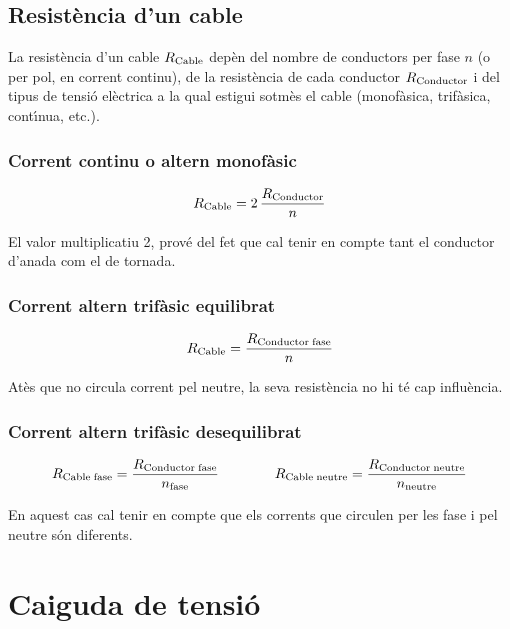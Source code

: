 \subsection{Resist\`{e}ncia d'un cable}

La resist\`{e}ncia d'un cable $R_\mathrm{Cable}$ dep\`{e}n del nombre de conductors per fase $n$ (o
per pol, en corrent continu), de la resist\`{e}ncia de cada conductor $R_\mathrm{Conductor}$ i del
tipus de tensi\'{o} el\`{e}ctrica a la qual estigui sotm\`{e}s el cable (monof\`{a}sica, trif\`{a}sica,
cont\'{\i}nua, etc.).

\subsubsection*{Corrent continu o altern monof\`{a}sic}
\begin{equation}\label{eq:r_cc_mono}
    R_\mathrm{Cable} = 2\, \frac{R_\mathrm{Conductor}}{n}
\end{equation}

El valor multiplicatiu 2, prov\'{e} del fet que cal tenir en compte tant el conductor d'anada
com el de tornada.

\subsubsection*{Corrent altern trif\`{a}sic equilibrat}
\vspace{-5mm}
\begin{equation}\label{eq:r_trifas}
R_\mathrm{Cable} = \frac{R_\mathrm{Conductor\;fase}}{n}
\end{equation}

At\`{e}s que no circula corrent pel neutre, la seva resist\`{e}ncia no hi t\'{e} cap influ\`{e}ncia.

\subsubsection*{Corrent altern trif\`{a}sic desequilibrat}
\begin{equation}
    R_\mathrm{Cable\;fase} = \frac{R_\mathrm{Conductor\;fase}}{n_\mathrm{fase}} \qquad\qquad
    R_\mathrm{Cable\; neutre} = \frac{R_\mathrm{Conductor\;neutre}}{n_\mathrm{neutre}}
\end{equation}

En aquest cas cal tenir en compte que els corrents que circulen per les fase i pel neutre
s\'{o}n diferents.


\section{Caiguda de tensi\'{o}}

